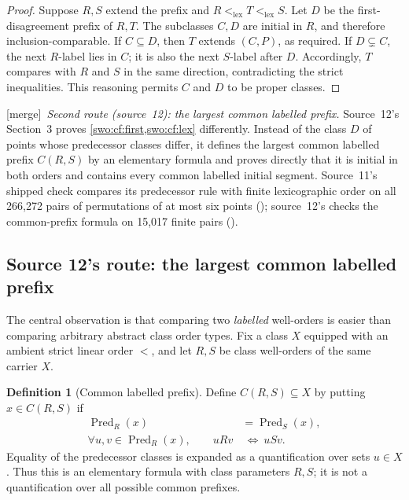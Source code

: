 \documentclass[11pt]{article}
\theoremstyle{definition}
\newtheorem{definition}[definition]{Definition}
\theoremstyle{remark}
\newcommand{\lex}{\mathrm{lex}}
\newcommand{\pred}{\operatorname{Pred}}
\newcommand{\merge}{\textsf{[merge]}}
\begin{document}
\begin{proof}
Suppose \(R,S\) extend the prefix and \(R<_{\lex}T<_{\lex}S\).
Let \(D\) be the first-disagreement prefix of \(R,T\).  The subclasses
\(C,D\) are initial in \(R\), and therefore inclusion-comparable.
If \(C\subseteq D\), then \(T\) extends \((C,P)\), as required.
If \(D\subsetneq C\), the next \(R\)-label lies in \(C\); it is
also the next \(S\)-label after \(D\).  Accordingly, \(T\) compares
with \(R\) and \(S\) in the same direction, contradicting the strict
inequalities.  This reasoning permits \(C\) and \(D\) to be proper
classes.
\end{proof}


\merge\ \emph{Second route (source~12): the largest common labelled prefix.}
Source~12's Section~3 proves \cref{swo:cf:first,swo:cf:lex} differently.
Instead of the class $D$ of points whose predecessor classes differ, it
defines the largest common labelled prefix $C(R,S)$ by an elementary formula
and proves directly that it is initial in both orders and contains every
common labelled initial segment. Source~11's shipped check compares its
predecessor rule with finite lexicographic order on all 266,272 pairs of
permutations of at most six points
(); source~12's checks the
common-prefix formula on 15,017 finite pairs
().

\subsection{Source 12's route: the largest common labelled prefix}
\label{swo:st:sec:commonprefix}

The central observation is that comparing two \emph{labelled}
well-orders is easier than comparing arbitrary abstract class order types.
Fix a class $X$ equipped with an ambient strict linear order $<$, and let
$R,S$ be class well-orders of the same carrier $X$.

\begin{definition}[Common labelled prefix]\label{swo:st:n3.1}
Define $C(R,S)\subseteq X$ by putting $x\in C(R,S)$ if
\begin{align*}
 \pred_R(x)&=\pred_S(x),\\
 \forall u,v\in\pred_R(x),\qquad uRv&\ \Longleftrightarrow\ uSv.
\end{align*}
Equality of the predecessor classes is expanded as a quantification over
sets $u\in X$. Thus this is an elementary formula with class parameters
$R,S$; it is not a quantification over all possible common prefixes.
\end{definition}
\end{document}
